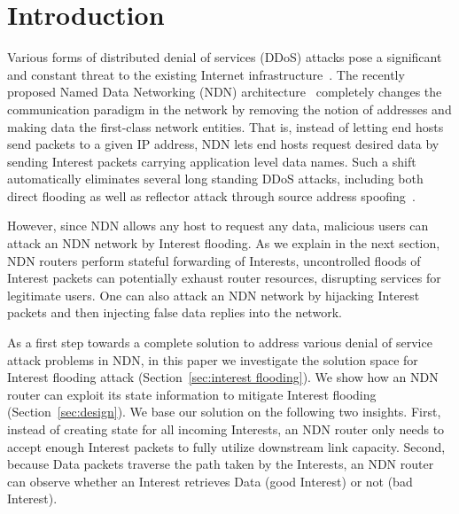 \section{Introduction}
\label{sec:intro}





Various forms of distributed denial of services (DDoS) attacks pose a significant and constant threat to the existing Internet infrastructure~\cite{arbor-report}.
The recently proposed Named Data Networking (NDN) architecture~\cite{ndn-conext, ndn-tr} completely changes the communication paradigm in the network by removing the notion of addresses and making data the first-class network entities.
That is, instead of letting end hosts send packets to a given IP address, NDN lets end hosts request desired data by sending Interest packets carrying application level data names.
Such a shift automatically eliminates several long standing DDoS attacks, including both direct flooding as well as reflector attack through source address spoofing~\cite{mirkovic2004taxonomy}.

However, since NDN allows any host to request any data, malicious users can attack an NDN network by Interest flooding. As we explain in the next section, NDN routers perform stateful forwarding of Interests, uncontrolled floods of Interest packets can potentially exhaust router resources, disrupting services for legitimate users.  
One can also attack an NDN network by hijacking Interest packets and then injecting false data replies into the network.
 
As a first step towards a complete solution to address various denial of service attack problems in NDN, in this paper we investigate the solution space for Interest flooding attack (Section~\ref{sec:interest flooding}).  
We show how an NDN router can exploit its state information to mitigate Interest flooding (Section~\ref{sec:design}).
We base our solution on the following two insights.
First, instead of creating state for all incoming Interests, an NDN router only needs to accept enough Interest packets to fully utilize downstream link capacity.
Second, because Data packets traverse the path taken by the Interests, an NDN router can observe whether an Interest retrieves Data (good Interest) or not (bad Interest).
 
